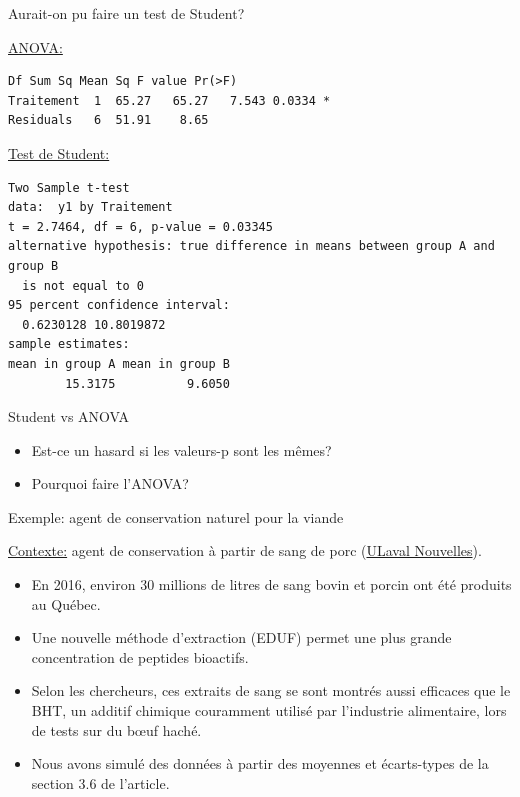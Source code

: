 \documentclass{BeamerTemplate}
\begin{document}
\begin{frame}[fragile,t]{Aurait-on pu faire un test de Student?}

\underline{ANOVA:}
\begin{Verbatim}[fontsize=\scriptsize]
           Df Sum Sq Mean Sq F value Pr(>F)
Traitement  1  65.27   65.27   7.543 0.0334 *
Residuals   6  51.91    8.65
\end{Verbatim}

\underline{Test de Student:}
\begin{Verbatim}[fontsize=\scriptsize]
        Two Sample t-test
data:  y1 by Traitement
t = 2.7464, df = 6, p-value = 0.03345
alternative hypothesis: true difference in means between group A and group B
  is not equal to 0
95 percent confidence interval:
  0.6230128 10.8019872
sample estimates:
mean in group A mean in group B
        15.3175          9.6050
\end{Verbatim}

\end{frame}

\begin{frame}[t]{Student vs ANOVA}

\begin{itemize}\itemsep8mm
  \item Est-ce un hasard si les valeurs-p sont les mêmes?
  \vspace{2cm}
  \item Pourquoi faire l'ANOVA?
  \vspace{2cm}
\end{itemize}

\end{frame}

\begin{frame}[t]{Exemple: agent de conservation naturel pour la viande}

\small
\underline{Contexte:} agent de conservation à partir de sang de porc
(\href{https://nouvelles.ulaval.ca/recherche/de-residu-a-source-dagents-de-conservation-naturels-0797d4c252cd98ac53f75a256e95624a}{ULaval Nouvelles}).

\begin{itemize}\itemsep2mm
  \item En 2016, environ 30 millions de litres de sang bovin et porcin ont été
  produits au Québec.
  \item Une nouvelle méthode d'extraction (EDUF) permet une plus grande
  concentration de peptides bioactifs.
  \item Selon les chercheurs, ces extraits de sang se sont montrés aussi efficaces
  que le BHT, un additif chimique couramment utilisé par l'industrie alimentaire,
  lors de tests sur du b\oe uf haché.
  \item Nous avons \alert{simulé} des données à partir des moyennes et écarts-types
  de la section 3.6 de l'article.
\end{itemize}

\end{frame}
\end{document}
